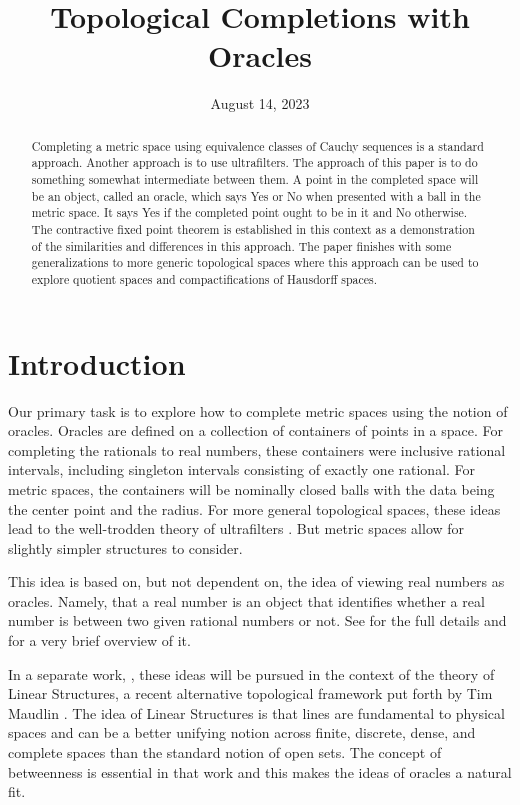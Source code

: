 \documentclass[12pt]{article}
\title{Topological Completions with Oracles}
\date{August 14, 2023}
\begin{document}
\maketitle
\begin{abstract}
Completing a metric space using equivalence classes of Cauchy sequences is a standard approach. Another approach is to use ultrafilters. The approach of this paper is to do something somewhat intermediate between them. A point in the completed space will be an object, called an oracle, which says Yes or No when presented with a ball in the metric space. It says Yes if the completed point ought to be in it and No otherwise. The contractive fixed point theorem is established in this context as a demonstration of the similarities and differences in this approach. The paper finishes with some generalizations to more generic topological spaces where this approach can be used to explore quotient spaces and compactifications of Hausdorff spaces. 
\end{abstract}

\tableofcontents

\section{Introduction}

Our primary task is to explore how to complete metric spaces using the notion of oracles. Oracles are defined on a collection of containers of points in a space. For completing the rationals to real numbers, these containers were inclusive rational intervals, including singleton intervals consisting of exactly one rational. For metric spaces, the containers will be nominally closed balls with the data being the center point and the radius. For more general topological spaces, these ideas lead to the well-trodden theory of ultrafilters \cite{samuel}. But metric spaces allow for slightly simpler structures to consider. 

This idea is based on, but not dependent on, the idea of viewing real numbers as oracles. Namely, that a real number is an object that identifies whether a real number is between two given rational numbers or not. See \cite{taylor23main} for the full details and \cite{taylor23teaser} for a very brief overview of it. 
 
In a separate work, \cite{taylor23maudlin}, these ideas will be pursued in the context of the theory of Linear Structures, a recent alternative topological framework put forth by Tim Maudlin \cite{maudlin}. The idea of Linear Structures is that lines are fundamental to physical spaces and can be a better unifying notion across finite, discrete, dense, and complete spaces than the standard notion of open sets. The concept of betweenness is essential in that work and this makes the ideas of oracles a natural fit. 
\end{document}
